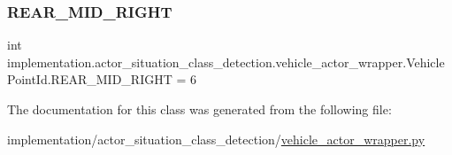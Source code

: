 \subsubsection{\texorpdfstring{R\+E\+A\+R\+\_\+\+M\+I\+D\+\_\+\+R\+I\+G\+HT}{REAR\_MID\_RIGHT}}
{\footnotesize\ttfamily int implementation.\+actor\+\_\+situation\+\_\+class\+\_\+detection.\+vehicle\+\_\+actor\+\_\+wrapper.\+Vehicle\+Point\+Id.\+R\+E\+A\+R\+\_\+\+M\+I\+D\+\_\+\+R\+I\+G\+HT = 6\hspace{0.3cm}{\ttfamily [static]}}



The documentation for this class was generated from the following file\+:\begin{DoxyCompactItemize}
\item 
implementation/actor\+\_\+situation\+\_\+class\+\_\+detection/\hyperlink{vehicle__actor__wrapper_8py}{vehicle\+\_\+actor\+\_\+wrapper.\+py}\end{DoxyCompactItemize}
